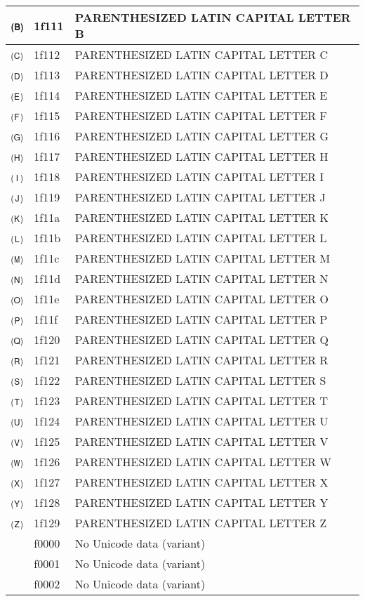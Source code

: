 \documentclass[12pt,letterpaper,openany]{book}
\begin{document}
\begin{center}
\begin{supertabular}{|m{0.25in}|m{0.5in}|m{4in}|}
🄑 & 1f111 & PARENTHESIZED LATIN CAPITAL LETTER B\\\hline
🄒 & 1f112 & PARENTHESIZED LATIN CAPITAL LETTER C\\\hline
🄓 & 1f113 & PARENTHESIZED LATIN CAPITAL LETTER D\\\hline
🄔 & 1f114 & PARENTHESIZED LATIN CAPITAL LETTER E\\\hline
🄕 & 1f115 & PARENTHESIZED LATIN CAPITAL LETTER F\\\hline
🄖 & 1f116 & PARENTHESIZED LATIN CAPITAL LETTER G\\\hline
🄗 & 1f117 & PARENTHESIZED LATIN CAPITAL LETTER H\\\hline
🄘 & 1f118 & PARENTHESIZED LATIN CAPITAL LETTER I\\\hline
🄙 & 1f119 & PARENTHESIZED LATIN CAPITAL LETTER J\\\hline
🄚 & 1f11a & PARENTHESIZED LATIN CAPITAL LETTER K\\\hline
🄛 & 1f11b & PARENTHESIZED LATIN CAPITAL LETTER L\\\hline
🄜 & 1f11c & PARENTHESIZED LATIN CAPITAL LETTER M\\\hline
🄝 & 1f11d & PARENTHESIZED LATIN CAPITAL LETTER N\\\hline
🄞 & 1f11e & PARENTHESIZED LATIN CAPITAL LETTER O\\\hline
🄟 & 1f11f & PARENTHESIZED LATIN CAPITAL LETTER P\\\hline
🄠 & 1f120 & PARENTHESIZED LATIN CAPITAL LETTER Q\\\hline
🄡 & 1f121 & PARENTHESIZED LATIN CAPITAL LETTER R\\\hline
🄢 & 1f122 & PARENTHESIZED LATIN CAPITAL LETTER S\\\hline
🄣 & 1f123 & PARENTHESIZED LATIN CAPITAL LETTER T\\\hline
🄤 & 1f124 & PARENTHESIZED LATIN CAPITAL LETTER U\\\hline
🄥 & 1f125 & PARENTHESIZED LATIN CAPITAL LETTER V\\\hline
🄦 & 1f126 & PARENTHESIZED LATIN CAPITAL LETTER W\\\hline
🄧 & 1f127 & PARENTHESIZED LATIN CAPITAL LETTER X\\\hline
🄨 & 1f128 & PARENTHESIZED LATIN CAPITAL LETTER Y\\\hline
🄩 & 1f129 & PARENTHESIZED LATIN CAPITAL LETTER Z\\\hline
󰀀 & f0000 & No Unicode data (variant)\\\hline
󰀁 & f0001 & No Unicode data (variant)\\\hline
󰀂 & f0002 & No Unicode data (variant)\\\hline

\end{supertabular}
\end{center}
\end{document}
